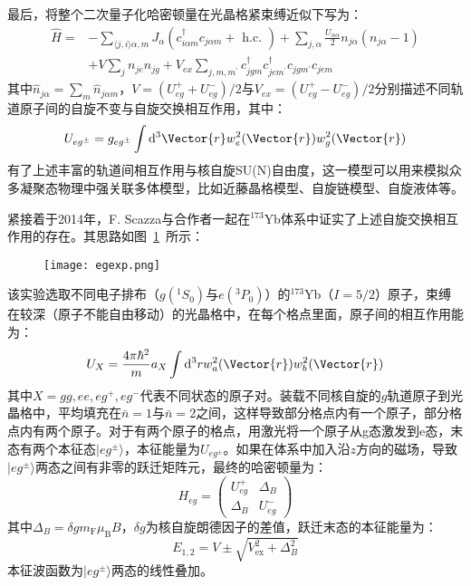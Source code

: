 最后，将整个二次量子化哈密顿量在光晶格紧束缚近似下写为：
\begin{equation}
\begin{aligned}
\hat{H}=&-\sum_{\langle j, i\rangle \alpha, m} J_{\alpha}\left(c_{i \alpha m}^{\dagger} c_{j \alpha m}+\text { h.c. }\right)+\sum_{j, \alpha} \frac{U_{\alpha \alpha}}{2} n_{j \alpha}\left(n_{j \alpha}-1\right) \\
&+V \sum_{j} n_{j e} n_{j g}+V_{e x} \sum_{j, m, m^{\prime}} c_{j g m}^{\dagger} c_{j e m^{\prime}}^{\dagger} c_{j g m^{\prime}} c_{j e m}
\end{aligned}
\end{equation}
其中$\hat{n}_{j\alpha}=\sum_m \hat{n}_{j\alpha m}$，$V=\left(U_{e g}^{+}+U_{e g}^{-}\right) / 2$与$V_{ex}=\left(U_{e g}^{+}-U_{e g}^{-}\right) / 2$分别描述不同轨道原子间的自旋不变与自旋交换相互作用，其中：
\begin{equation}
U_{eg^\pm} = g_{eg^\pm} \int \mathrm{d}^{3} \Vector{r} w_e^2(\Vector{r})w_g^2(\Vector{r})
\end{equation}
有了上述丰富的轨道间相互作用与核自旋SU(N)自由度，这一模型可以用来模拟众多凝聚态物理中强关联多体模型，比如近藤晶格模型、自旋链模型、自旋液体等。

紧接着于2014年，F. Scazza\cite{scazza2014observation}与合作者一起在${}^{173}$Yb体系中证实了上述自旋交换相互作用的存在。其思路如图~\ref{egexp}~所示：
\begin{figure}[!htbp]
    \centering
    \texttt{[image: egexp.png]}
    \label{egexp}
\end{figure}
该实验选取不同电子排布（$g({}^1S_0)$与$e({}^3P_0)$）的${}^{173}$Yb（$I=5/2$）原子，束缚在较深（原子不能自由移动）的光晶格中，在每个格点里面，原子间的相互作用能为：
\begin{equation}
U_{X}=\frac{4 \pi \hbar^{2}}{m} a_{X} \int \mathrm{d}^{3} r w_{a}^{2}(\Vector{r}) w_{b}^{2}(\Vector{r})
\end{equation}
其中$X =gg, ee, eg^+, eg^−$代表不同状态的原子对。装载不同核自旋的$g$轨道原子到光晶格中，平均填充在$\bar{n}=1$与$\bar{n}=2$之间，这样导致部分格点内有一个原子，部分格点内有两个原子。对于有两个原子的格点，用激光将一个原子从g态激发到e态，末态有两个本征态$|eg^\pm\rangle$，本征能量为$U_{eg^\pm}$。如果在体系中加入沿$z$方向的磁场，导致$|eg^\pm\rangle$两态之间有非零的跃迁矩阵元，最终的哈密顿量为：
\begin{equation}
H_{e g}=\left(\begin{array}{cc}
U_{e g}^{+} & \Delta_{B} \\
\Delta_{B} & U_{e g}^{-}
\end{array}\right)
\end{equation}
其中$\Delta_{B}=\delta g m_{\mathrm{F}} \mu_{\mathrm{B}} B$，$\delta g$为核自旋朗德因子的差值，跃迁末态的本征能量为：
\begin{equation}
E_{1,2}=V \pm \sqrt{V_{\mathrm{ex}}^{2}+\Delta_{B}^{2}}
\end{equation}
本征波函数为$|eg^\pm\rangle$两态的线性叠加。

